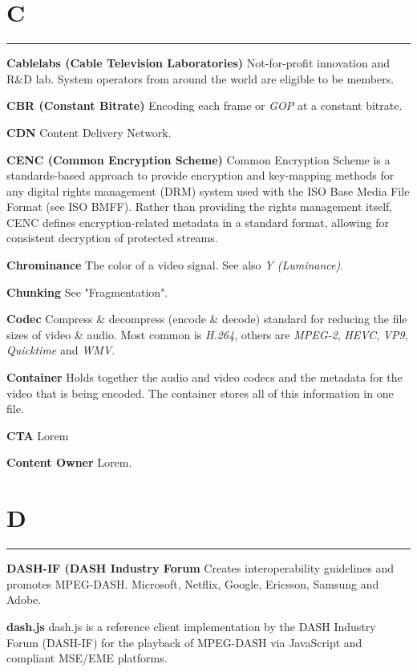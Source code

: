 \section{C}
\hrule

\medskip
\textbf{Cablelabs (Cable Television Laboratories)}
Not-for-profit innovation and R\&D lab. System operators from around the world are eligible to be members.

\smallskip
\textbf{CBR (Constant Bitrate)}
Encoding each frame or \textit{GOP} at a constant bitrate.

\smallskip
\textbf{CDN}
Content Delivery Network.

\smallskip
\textbf{CENC (Common Encryption Scheme)}
Common Encryption Scheme is a standards-based approach to provide encryption and key-mapping methods for any digital rights management (DRM) system used with the ISO Base Media File Format (see ISO BMFF). Rather than providing the rights management itself, CENC defines encryption-related metadata in a standard format, allowing for consistent decryption of protected streams.

\smallskip
\textbf{Chrominance}
The color of a video signal. See also \textit{Y (Luminance)}.

\smallskip
\textbf{Chunking}
See "Fragmentation".

\smallskip
\textbf{Codec}
Compress \& decompress (encode \& decode) standard for reducing the file sizes of video \& audio. Most common is \textit{H.264}, others are \textit{MPEG-2}, \textit{HEVC}, \textit{VP9}, \textit{Quicktime} and \textit{WMV}.

\smallskip
\textbf{Container}
Holds together the audio and video codecs and the metadata for the video that is being encoded. The container stores all of this information in one file.

\smallskip
\textbf{CTA}
Lorem

\smallskip
\textbf{Content Owner}
Lorem.

\section{D}
\hrule

\medskip
\textbf{DASH-IF (DASH Industry Forum}
Creates interoperability guidelines and promotes MPEG-DASH. Microsoft, Netflix, Google, Ericsson, Samsung and Adobe.

\smallskip
\textbf{dash.js}
dash.js is a reference client implementation by the DASH Industry Forum (DASH-IF) for the playback of MPEG-DASH via JavaScript and compliant MSE/EME platforms.

